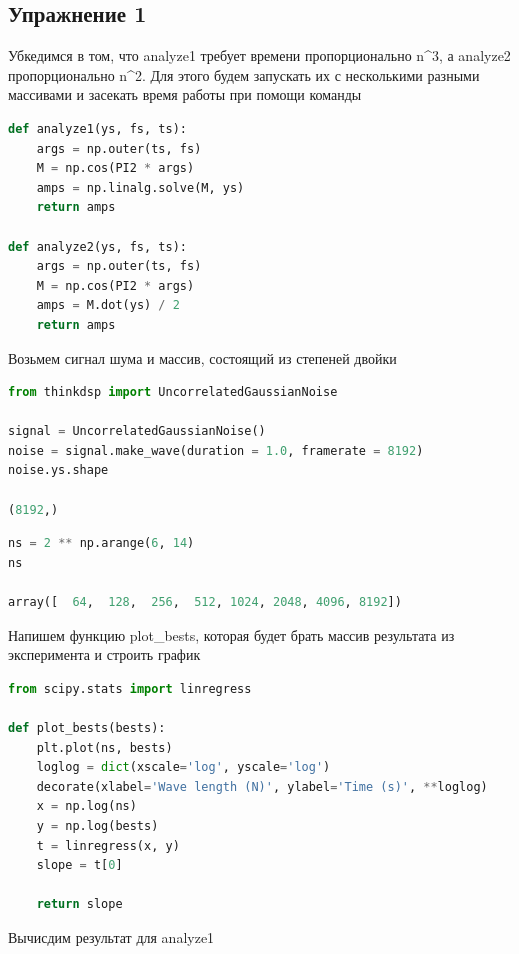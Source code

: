 \subsection{Упражнение 1}

Убкедимся в том, что analyze1 требует времени пропорционально n^3, а analyze2 пропорционально n^2. Для этого будем запускать их с несколькими разными массивами и засекать время работы при помощи команды %

\begin{lstlisting}[language=Python]
def analyze1(ys, fs, ts):
    args = np.outer(ts, fs)
    M = np.cos(PI2 * args)
    amps = np.linalg.solve(M, ys)
    return amps
    
def analyze2(ys, fs, ts):
    args = np.outer(ts, fs)
    M = np.cos(PI2 * args)
    amps = M.dot(ys) / 2
    return amps
\end{lstlisting}

Возьмем сигнал шума и массив, состоящий из степеней двойки

\begin{lstlisting}[language=Python]
from thinkdsp import UncorrelatedGaussianNoise

signal = UncorrelatedGaussianNoise()
noise = signal.make_wave(duration = 1.0, framerate = 8192)
noise.ys.shape

(8192,)
\end{lstlisting}

\begin{lstlisting}[language=Python]
ns = 2 ** np.arange(6, 14)
ns

array([  64,  128,  256,  512, 1024, 2048, 4096, 8192])
\end{lstlisting}

Напишем функцию plot_bests, которая будет брать массив результата из эксперимента и строить график

\begin{lstlisting}[language=Python]
from scipy.stats import linregress

def plot_bests(bests):
    plt.plot(ns, bests)
    loglog = dict(xscale='log', yscale='log')
    decorate(xlabel='Wave length (N)', ylabel='Time (s)', **loglog)
    x = np.log(ns)
    y = np.log(bests)
    t = linregress(x, y)
    slope = t[0]

    return slope
\end{lstlisting}

Вычисдим результат для analyze1

